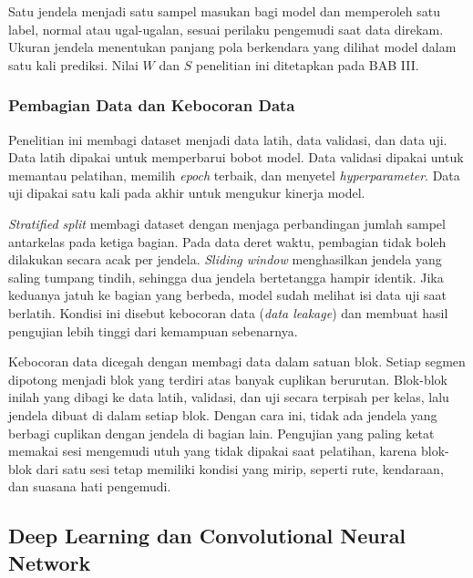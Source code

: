 Satu jendela menjadi satu sampel masukan bagi model dan memperoleh satu label, normal atau ugal-ugalan, sesuai perilaku pengemudi saat data direkam. Ukuran jendela menentukan panjang pola berkendara yang dilihat model dalam satu kali prediksi. Nilai $W$ dan $S$ penelitian ini ditetapkan pada BAB III.

\subsubsection{Pembagian Data dan Kebocoran Data}
Penelitian ini membagi dataset menjadi data latih, data validasi, dan data uji. Data latih dipakai untuk memperbarui bobot model. Data validasi dipakai untuk memantau pelatihan, memilih \textit{epoch} terbaik, dan menyetel \textit{hyperparameter}. Data uji dipakai satu kali pada akhir untuk mengukur kinerja model.

\textit{Stratified split} membagi dataset dengan menjaga perbandingan jumlah sampel antarkelas pada ketiga bagian. Pada data deret waktu, pembagian tidak boleh dilakukan secara acak per jendela. \textit{Sliding window} menghasilkan jendela yang saling tumpang tindih, sehingga dua jendela bertetangga hampir identik. Jika keduanya jatuh ke bagian yang berbeda, model sudah melihat isi data uji saat berlatih. Kondisi ini disebut kebocoran data (\textit{data leakage}) dan membuat hasil pengujian lebih tinggi dari kemampuan sebenarnya.

Kebocoran data dicegah dengan membagi data dalam satuan blok. Setiap segmen dipotong menjadi blok yang terdiri atas banyak cuplikan berurutan. Blok-blok inilah yang dibagi ke data latih, validasi, dan uji secara terpisah per kelas, lalu jendela dibuat di dalam setiap blok. Dengan cara ini, tidak ada jendela yang berbagi cuplikan dengan jendela di bagian lain. Pengujian yang paling ketat memakai sesi mengemudi utuh yang tidak dipakai saat pelatihan, karena blok-blok dari satu sesi tetap memiliki kondisi yang mirip, seperti rute, kendaraan, dan suasana hati pengemudi.

\subsection{Deep Learning dan Convolutional Neural Network}
